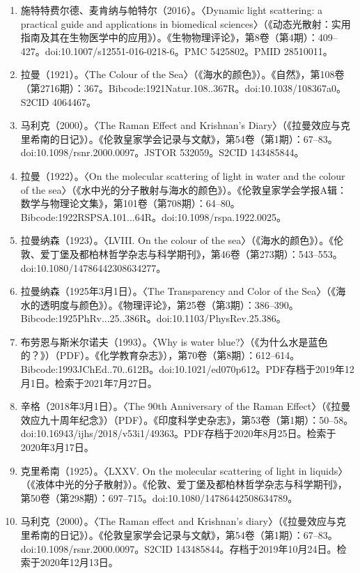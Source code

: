 \begin{enumerate}
\item 施特特费尔德、麦肯纳与帕特尔（2016）。〈Dynamic light scattering: a practical guide and applications in biomedical sciences〉（《动态光散射：实用指南及其在生物医学中的应用》）。《生物物理评论》，第8卷（第4期）：409–427。doi:10.1007/s12551-016-0218-6。PMC 5425802。PMID 28510011。
\item 拉曼（1921）。〈The Colour of the Sea〉（《海水的颜色》）。《自然》，第108卷（第2716期）：367。Bibcode:1921Natur.108..367R。doi:10.1038/108367a0。S2CID 4064467。
\item 马利克（2000）。〈The Raman Effect and Krishnan's Diary〉（《拉曼效应与克里希南的日记》）。《伦敦皇家学会记录与文献》，第54卷（第1期）：67–83。doi:10.1098/rsnr.2000.0097。JSTOR 532059。S2CID 143485844。
\item 拉曼（1922）。〈On the molecular scattering of light in water and the colour of the sea〉（《水中光的分子散射与海水的颜色》）。《伦敦皇家学会学报A辑：数学与物理论文集》，第101卷（第708期）：64–80。Bibcode:1922RSPSA.101...64R。doi:10.1098/rspa.1922.0025。
\item 拉曼纳森（1923）。〈LVIII. On the colour of the sea〉（《海水的颜色》）。《伦敦、爱丁堡及都柏林哲学杂志与科学期刊》，第46卷（第273期）：543–553。doi:10.1080/14786442308634277。
\item 拉曼纳森（1925年3月1日）。〈The Transparency and Color of the Sea〉（《海水的透明度与颜色》）。《物理评论》，第25卷（第3期）：386–390。Bibcode:1925PhRv...25..386R。doi:10.1103/PhysRev.25.386。
\item 布劳恩与斯米尔诺夫（1993）。〈Why is water blue?〉（《为什么水是蓝色的？》）（PDF）。《化学教育杂志》），第70卷（第8期）：612–614。Bibcode:1993JChEd..70..612B。doi:10.1021/ed070p612。PDF存档于2019年12月1日。检索于2021年7月27日。
\item 辛格（2018年3月1日）。〈The 90th Anniversary of the Raman Effect〉（《拉曼效应九十周年纪念》）（PDF）。《印度科学史杂志》，第53卷（第1期）：50–58。doi:10.16943/ijhs/2018/v53i1/49363。PDF存档于2020年8月25日。检索于2020年3月17日。
\item 克里希南（1925）。〈LXXV. On the molecular scattering of light in liquids〉（《液体中光的分子散射》）。《伦敦、爱丁堡及都柏林哲学杂志与科学期刊》，第50卷（第298期）：697–715。doi:10.1080/14786442508634789。
\item 马利克（2000）。〈The Raman effect and Krishnan's diary〉（《拉曼效应与克里希南的日记》）。《伦敦皇家学会记录与文献》，第54卷（第1期）：67–83。doi:10.1098/rsnr.2000.0097。S2CID 143485844。存档于2019年10月24日。检索于2020年12月13日。

\end{enumerate}
